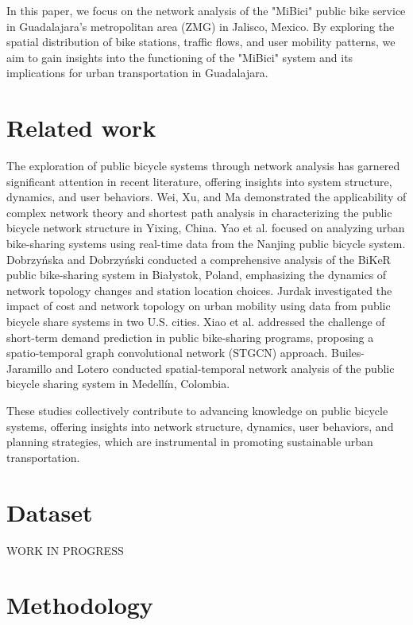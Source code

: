 \documentclass[conference]{IEEEtran}
\begin{document}
In this paper, we focus on the network analysis of the "MiBici" public bike service in Guadalajara's metropolitan area (ZMG) in Jalisco, Mexico. By exploring the spatial distribution of bike stations, traffic flows, and user mobility patterns, we aim to gain insights into the functioning of the "MiBici" system and its implications for urban transportation in Guadalajara.

\section{Related work}

The exploration of public bicycle systems through network analysis has garnered significant attention in recent literature, offering insights into system structure, dynamics, and user behaviors. Wei, Xu, and Ma \cite{wei2019exploring} demonstrated the applicability of complex network theory and shortest path analysis in characterizing the public bicycle network structure in Yixing, China. Yao et al. \cite{yao2019analysis} focused on analyzing urban bike-sharing systems using real-time data from the Nanjing public bicycle system. Dobrzyńska and Dobrzyński \cite{dobrzynska2017structure} conducted a comprehensive analysis of the BiKeR public bike-sharing system in Białystok, Poland, emphasizing the dynamics of network topology changes and station location choices. Jurdak \cite{jurdak2013impact} investigated the impact of cost and network topology on urban mobility using data from public bicycle share systems in two U.S. cities. Xiao et al. \cite{xiao2021demand} addressed the challenge of short-term demand prediction in public bike-sharing programs, proposing a spatio-temporal graph convolutional network (STGCN) approach. Builes-Jaramillo and Lotero \cite{builes-jaramillo2022spatial} conducted spatial-temporal network analysis of the public bicycle sharing system in Medellín, Colombia. 

These studies collectively contribute to advancing knowledge on public bicycle systems, offering insights into network structure, dynamics, user behaviors, and planning strategies, which are instrumental in promoting sustainable urban transportation.

\section{Dataset}

WORK IN PROGRESS

\section{Methodology}
\end{document}
